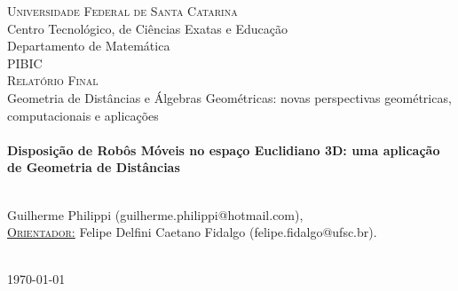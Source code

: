 \documentclass[a4paper,12pt]{report}
\begin{document}
\begin{titlepage}
		\textsc{\LARGE \hspace{-0.17cm}Universidade Federal de Santa Catarina}\\[0.5cm] %
		{\Large Centro Tecnológico, de Ciências Exatas e Educação\\ Departamento de Matemática}\\[1.5cm] %
		\textsc{\Large PIBIC \\ Relatório Final \vspace{1.5cm}  \\ }{\large Geometria de Distâncias e Álgebras Geométricas: novas perspectivas geométricas, computacionais e aplicações}\\[2.0cm] %
		
		
		
		\HRule \\[0.4cm]
		{ \LARGE \bfseries \textbf{Disposição de Robôs Móveis no espaço Euclidiano 3D: uma aplicação de Geometria de Distâncias}} \\ [0.4cm] %
		\HRule \\[2cm]
		
		
		\begin{minipage}{1\textwidth}
			\begin{center} \large
				Guilherme Philippi (guilherme.philippi@hotmail.com),
				\vspace{0.5cm}
				\\
				\underline{\textsc{Orientador:}} \vspace{0.2cm}
				Felipe Delfini Caetano Fidalgo (felipe.fidalgo@ufsc.br).
			\end{center}
		\end{minipage} \\[2cm]
		
		
		{\large \today} %
		
		
		\vfill %
		
	\end{titlepage}
	
\end{document}
